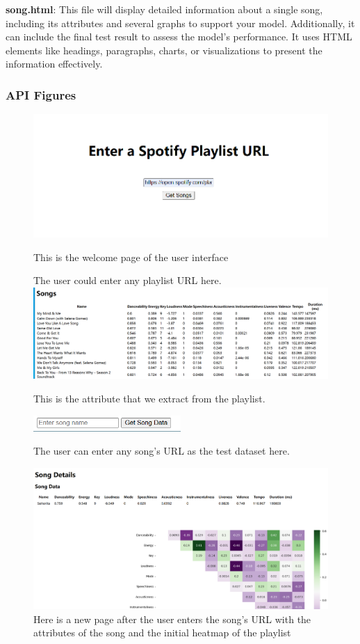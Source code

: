 \documentclass[titlepage]{article}
\begin{document}
\textbf{song.html}: This file will display detailed information about a single song, including its attributes and several graphs to support your model. Additionally, it can include the final test result to assess the model's performance. It uses HTML elements like headings, paragraphs, charts, or visualizations to present the information effectively.
\subsubsection{API Figures}
\begin{figure}[!h]
\centering
\includegraphics[width=1\textwidth]{1.png}
\caption{This is the welcome page of the user interface}
The user could enter any playlist URL here.
\label{fig:enter-label}
\includegraphics[width=1\textwidth]{2.png}
\caption{This is the attribute that we extract from the playlist.}
\includegraphics[width=0.5\textwidth]{3.png}
\caption{The user can enter any song's URL as the test dataset here.}

\includegraphics[width=1\textwidth]{4.png}
\caption{Here is a new page after the user enters the song's URL with the attributes of the song and the initial heatmap of the playlist}

\end{figure}
\end{document}
